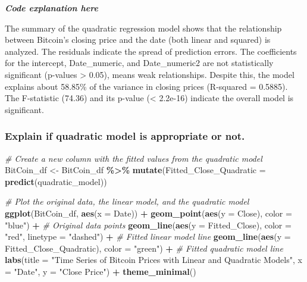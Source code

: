 \documentclass[
]{book}
\newenvironment{Shaded}{\begin{snugshade}}{\end{snugshade}}
\newcommand{\AttributeTok}[1]{\textcolor[rgb]{0.13,0.29,0.53}{#1}}
\newcommand{\CommentTok}[1]{\textcolor[rgb]{0.56,0.35,0.01}{\textit{#1}}}
\newcommand{\FunctionTok}[1]{\textcolor[rgb]{0.13,0.29,0.53}{\textbf{#1}}}
\newcommand{\NormalTok}[1]{#1}
\newcommand{\OtherTok}[1]{\textcolor[rgb]{0.56,0.35,0.01}{#1}}
\newcommand{\SpecialCharTok}[1]{\textcolor[rgb]{0.81,0.36,0.00}{\textbf{#1}}}
\newcommand{\StringTok}[1]{\textcolor[rgb]{0.31,0.60,0.02}{#1}}
\begin{document}
\emph{\textbf{Code explanation here}}

The summary of the quadratic regression model shows that the relationship between Bitcoin's closing price and the date (both linear and squared) is analyzed. The residuals indicate the spread of prediction errors. The coefficients for the intercept, Date\_numeric, and Date\_numeric2 are not statistically significant (p-values \textgreater{} 0.05), means weak relationships. Despite this, the model explains about 58.85\% of the variance in closing prices (R-squared = 0.5885). The F-statistic (74.36) and its p-value (\textless{} 2.2e-16) indicate the overall model is significant.

\subsubsection{Explain if quadratic model is appropriate or not.}\label{explain-if-quadratic-model-is-appropriate-or-not.}

\begin{Shaded}
\begin{Highlighting}[]
\CommentTok{\# Create a new column with the fitted values from the quadratic model}
\NormalTok{BitCoin\_df }\OtherTok{\textless{}{-}}\NormalTok{ BitCoin\_df }\SpecialCharTok{\%\textgreater{}\%}
  \FunctionTok{mutate}\NormalTok{(}\AttributeTok{Fitted\_Close\_Quadratic =} \FunctionTok{predict}\NormalTok{(quadratic\_model))}

\CommentTok{\# Plot the original data, the linear model, and the quadratic model}
\FunctionTok{ggplot}\NormalTok{(BitCoin\_df, }\FunctionTok{aes}\NormalTok{(}\AttributeTok{x =}\NormalTok{ Date)) }\SpecialCharTok{+}
  \FunctionTok{geom\_point}\NormalTok{(}\FunctionTok{aes}\NormalTok{(}\AttributeTok{y =}\NormalTok{ Close), }\AttributeTok{color =} \StringTok{"blue"}\NormalTok{) }\SpecialCharTok{+}  \CommentTok{\# Original data points}
  \FunctionTok{geom\_line}\NormalTok{(}\FunctionTok{aes}\NormalTok{(}\AttributeTok{y =}\NormalTok{ Fitted\_Close), }\AttributeTok{color =} \StringTok{"red"}\NormalTok{, }\AttributeTok{linetype =} \StringTok{"dashed"}\NormalTok{) }\SpecialCharTok{+}  \CommentTok{\# Fitted linear model line}
  \FunctionTok{geom\_line}\NormalTok{(}\FunctionTok{aes}\NormalTok{(}\AttributeTok{y =}\NormalTok{ Fitted\_Close\_Quadratic), }\AttributeTok{color =} \StringTok{"green"}\NormalTok{) }\SpecialCharTok{+}  \CommentTok{\# Fitted quadratic model line}
  \FunctionTok{labs}\NormalTok{(}\AttributeTok{title =} \StringTok{"Time Series of Bitcoin Prices with Linear and Quadratic Models"}\NormalTok{,}
       \AttributeTok{x =} \StringTok{"Date"}\NormalTok{,}
       \AttributeTok{y =} \StringTok{"Close Price"}\NormalTok{) }\SpecialCharTok{+}
  \FunctionTok{theme\_minimal}\NormalTok{()}
\end{Highlighting}
\end{Shaded}
\end{document}
